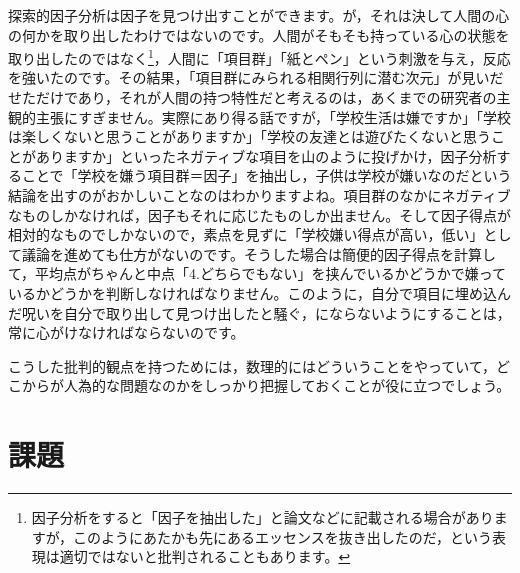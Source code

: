 \documentclass{ltjsbook}
\begin{document}
探索的因子分析は因子を見つけ出すことができます。が，それは決して人間の心の何かを取り出したわけではないのです。人間がそもそも持っている心の状態を取り出したのではなく\footnote{因子分析をすると「因子を抽出した」と論文などに記載される場合がありますが，このようにあたかも先にあるエッセンスを抜き出したのだ，という表現は適切ではないと批判されることもあります。}，人間に「項目群」「紙とペン」という刺激を与え，反応を強いたのです。その結果，「項目群にみられる相関行列に潜む次元」が見いだせただけであり，それが人間の持つ特性だと考えるのは，あくまでの研究者の主観的主張にすぎません。実際にあり得る話ですが，「学校生活は嫌ですか」「学校は楽しくないと思うことがありますか」「学校の友達とは遊びたくないと思うことがありますか」といったネガティブな項目を山のように投げかけ，因子分析することで「学校を嫌う項目群＝因子」を抽出し，子供は学校が嫌いなのだという結論を出すのがおかしいことなのはわかりますよね。項目群のなかにネガティブなものしかなければ，因子もそれに応じたものしか出ません。そして因子得点が相対的なものでしかないので，素点を見ずに「学校嫌い得点が高い，低い」として議論を進めても仕方がないのです。そうした場合は簡便的因子得点を計算して，平均点がちゃんと中点「4.どちらでもない」を挟んでいるかどうかで嫌っているかどうかを判断しなければなりません。このように，自分で項目に埋め込んだ呪いを自分で取り出して見つけ出したと騒ぐ，にならないようにすることは，常に心がけなければならないのです。

こうした批判的観点を持つためには，数理的にはどういうことをやっていて，どこからが人為的な問題なのかをしっかり把握しておくことが役に立つでしょう。

\section{課題}
\end{document}
